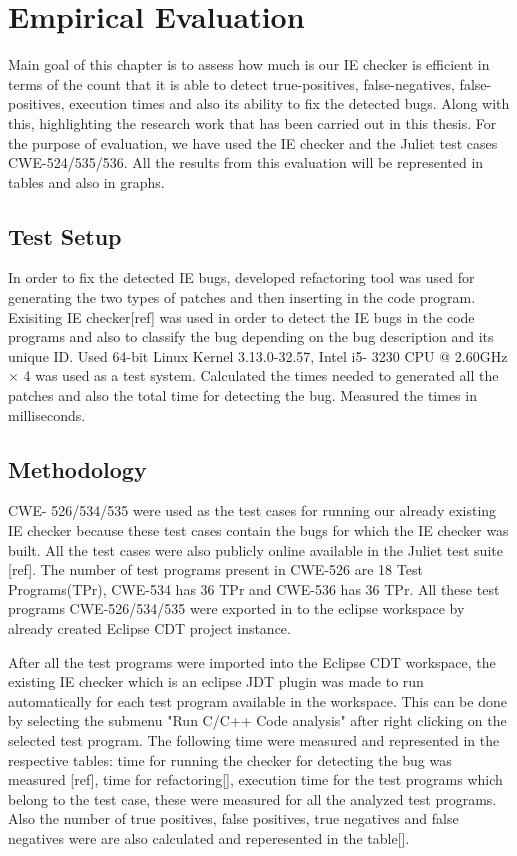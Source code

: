 \let\cleardoublepage\clearpage
\chapter{Empirical Evaluation}
\label{chapter:Evaluation}

Main goal of this chapter is to assess how much is our IE checker
is efficient in terms of the count that it is able to detect true-positives,
false-negatives, false-positives, execution times and also its ability to fix
the detected bugs. Along with this, highlighting the research work that has
been carried out in this thesis. For the purpose of evaluation, we have used
the IE checker and the Juliet test cases CWE-524/535/536. All the results
from this evaluation will be represented in tables and also in graphs.



\section{Test Setup}

In order to fix the detected IE bugs, developed refactoring tool was used
for generating the two types of patches and then inserting in the
code program. Exisiting IE checker[ref] was used in order to detect the 
IE bugs in the code programs and also to classify the bug depending on the
bug description and its unique ID. Used 64-bit Linux Kernel 3.13.0-32.57, Intel i5-
3230 CPU @ 2.60GHz × 4 was used as a test system. Calculated the times needed to generated
all the patches and also the total time for detecting the bug. Measured
the times in milliseconds.


\section{Methodology}

CWE- 526/534/535 were used as the test cases for running our already existing IE checker
because these test cases contain the bugs for which the IE checker was built.
All the test cases were also publicly online available in the 
Juliet test suite [ref]. The number of test programs present in CWE-526 are 18 Test Programs(TPr),
CWE-534 has 36 TPr and CWE-536 has 36 TPr. All these test programs CWE-526/534/535 were 
exported in to the eclipse workspace by already created Eclipse CDT project instance.

After all the test programs were imported into the Eclipse CDT workspace,
the existing IE checker which is an eclipse JDT plugin was made to 
run automatically for each test program available in the workspace.
This can be done by selecting the submenu "Run C/C++ Code analysis" after
right clicking on the selected test program. The following time were measured
and represented in the respective tables: time for running the checker for detecting the bug was
measured [ref], time for refactoring[], execution time for the test programs which belong
to the test case, these were measured for  all the analyzed test programs.
Also the number of true positives, false positives, true negatives and false negatives
were are also calculated and reperesented in the table[]. 

